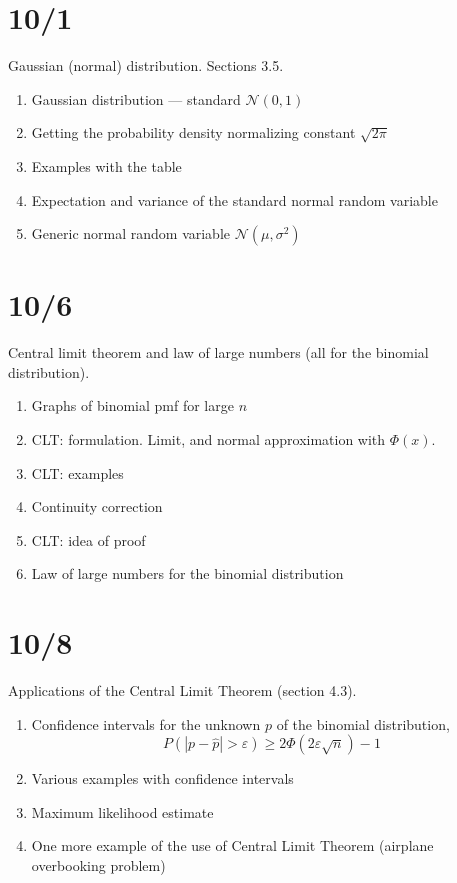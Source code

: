 \documentclass[letterpaper,11pt,oneside,reqno]{amsart}
\numberwithin{equation}{section}
\theoremstyle{definition}
\begin{document}
\section{10/1}

Gaussian (normal) distribution. Sections 3.5.
\begin{enumerate}
	\item Gaussian distribution --- standard $\mathcal{N}(0,1)$
	\item Getting the probability density normalizing constant $\sqrt{2\pi}$
	\item Examples with the table
	\item Expectation and variance of the standard normal random variable
	\item Generic normal random variable $\mathcal{N}(\mu,\sigma^2)$
\end{enumerate}

\section{10/6}

Central limit theorem and law of large numbers (all for the binomial distribution).

\begin{enumerate}
	\item Graphs of binomial pmf for large $n$
	\item CLT: formulation. Limit, and normal approximation with $\Phi(x)$.
	\item CLT: examples
	\item Continuity correction
	\item CLT: idea of proof
	\item Law of large numbers for the binomial distribution
\end{enumerate}

\section{10/8}

Applications of the Central Limit Theorem (section 4.3).
\begin{enumerate}
	\item Confidence intervals for the unknown $p$ of the binomial distribution,
		\begin{equation*}
			P(|p-\hat p|>\varepsilon) \ge 2\Phi(2\varepsilon\sqrt n)-1
		\end{equation*}
	\item Various examples with confidence intervals
	\item Maximum likelihood estimate
	\item One more example of the use of Central Limit Theorem (airplane overbooking problem)
\end{enumerate}
\end{document}
